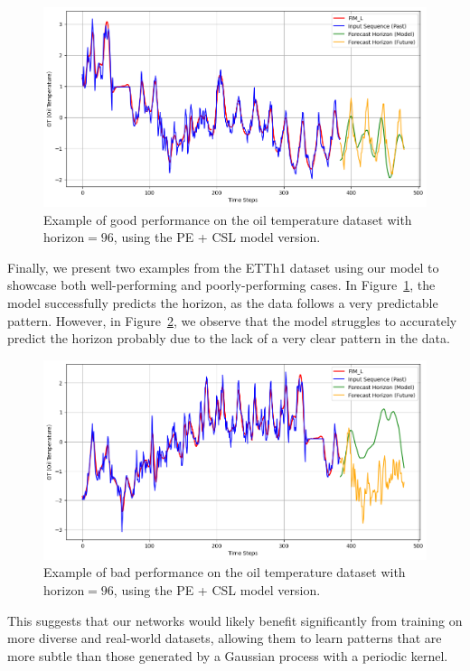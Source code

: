 \documentclass{article}
\theoremstyle{plain}
\theoremstyle{definition}
\theoremstyle{remark}
\begin{document}
\begin{figure}[h!]
    \centering
    \includegraphics[width=\linewidth]{assets/etth128-success.png}
    \caption{Example of good performance on the oil temperature dataset with $\text{horizon}=96$, using the PE + CSL model version.
    }
    \label{fig:etth96-success}
\end{figure}
Finally, we present two examples from the ETTh1 dataset using our model to showcase both well-performing and poorly-performing cases. In Figure~\ref{fig:etth96-success}, the model successfully predicts the horizon, as the data follows a very predictable pattern. However, in Figure~\ref{fig:etth96-fail}, we observe that the model struggles to accurately predict the horizon probably due to the lack of a very clear pattern in the data.


\begin{figure}[h!]
    \centering
    \includegraphics[width=\linewidth]{assets/etth128-fail.png}
    \caption{Example of bad performance on the oil temperature dataset with $\text{horizon}=96$, using the PE + CSL model version.
    }\label{fig:etth96-fail}
\end{figure}
This suggests that our networks would likely benefit significantly from training on more diverse and real-world datasets, allowing them to learn patterns that are more subtle than those generated by a Gaussian process with a periodic kernel.
\end{document}
